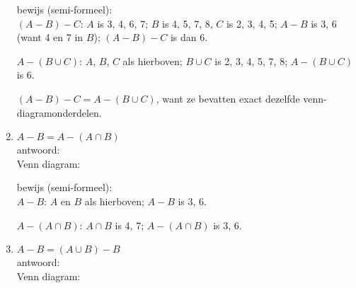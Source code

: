 \begin{answer}
\begin{enumerate}[label=\textit{\alph*.}]
    
    bewijs (semi-formeel): \\
    $(A-B)-C$: $A$ is 3, 4, 6, 7; $B$ is 4, 5, 7, 8, $C$ is 2, 3, 4, 5; $A-B$ is 3, 6 (want 4 en 7 in $B$); $(A-B)-C$ is dan 6.
    
    \noindent
    $A-(B\cup C)$: $A$, $B$, $C$ als hierboven; $B\cup C$ is 2, 3, 4, 5, 7, 8; $A-(B\cup C)$ is 6.
    
    \noindent
    $(A-B)-C=A-(B\cup C)$, want ze bevatten exact dezelfde venn-diagramonderdelen.
	
    
    \item $A-B=A-(A\cap B)$\\
    antwoord: \\
    Venn diagram:\\
    
    bewijs (semi-formeel): \\
    $A-B$: $A$ en $B$ als hierboven; $A-B$ is 3, 6.    
    
    \noindent
    $A-(A\cap B)$: $A\cap B$ is 4, 7; $A-(A\cap B)$ is 3, 6.
    \item $A-B=(A\cup B)-B$\\
    antwoord: \\
    Venn diagram:\\
\end{enumerate}
\end{answer}
